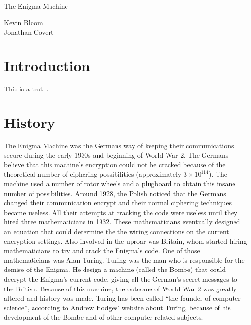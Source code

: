 \documentclass[12pt,a4paper,titlepage]{article}
\begin{document}
\pagestyle{headings}
\setcounter{page}{1}

\thispagestyle{empty}

\begin{flushleft}
\vspace*{1.5in}

{\huge The Enigma Machine}

\vspace{0.25in}

{\Large Kevin Bloom \\ Jonathan Covert}

\vspace{0.25in}

\vfill

\end{flushleft}

\newpage

\tableofcontents

\newpage

\section{Introduction}
This is a test~\cite{hold}.

\section{History}
The Enigma Machine was the Germans way of keeping their communications secure
during the early 1930s and beginning of World War 2. The Germans believe that
this machine's encryption could not be cracked because of the theoretical number
of ciphering possibilities (approximately $3 \times 10^{114}$). The machine used a
number of rotor wheels and a plugboard to obtain this insane number of
possibilities. Around 1928, the Polish noticed that the Germans changed their
communication encrypt and their normal ciphering techniques became useless. All
their attempts at cracking the code were useless until they hired three
mathematicians in 1932. These mathematicians eventually designed an equation that
could determine the the wiring connections on the current encryption settings.
Also involved in the uproar was Britain, whom started hiring mathematicians to
try and crack the Enigma's code. One of those mathematicians was Alan Turing.
Turing was the man who is responsible for the demise of the Enigma. He design a
machine (called the Bombe) that could decrypt the Enigma's current code, giving
all the German's secret messages to the British. Because of this machine, the
outcome of World War 2 was greatly altered and history was made. Turing has been
called ``the founder of computer science'', according to Andrew Hodges' website
about Turing, because of his development of the Bombe and of other computer
related subjects.
\cite{wilcox2006solving}
\end{document}
